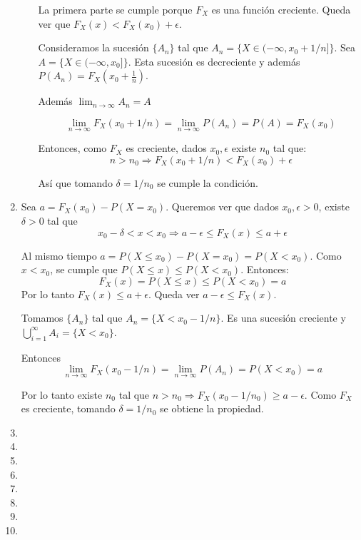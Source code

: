 \begin{enumerate}
\begin{enumerate}
					La primera parte se cumple porque $F_X$ es una función creciente. Queda ver que $F_X(x) < F_X(x_0) + \epsilon$.
					
					Consideramos la sucesión $\{A_n\}$ tal que $A_n = \{X \in (-\infty, x_0 + 1/n]\}$. Sea $A = \{X \in (-\infty, x_0]\}$.
					Esta sucesión es decreciente y además $P(A_n) = F_X(x_0+\frac{1}{n})$.
					
					Además $\lim_{n\rightarrow \infty}A_n = A$
					
					$$\lim_{n\rightarrow \infty}F_X(x_0 + 1/n) = \lim_{n\rightarrow \infty}P(A_n) = P(A) = F_X(x_0)$$
					
					Entonces, como $F_X$ es creciente, dados $x_0, \epsilon$ existe $n_0$ tal que:
					$$n > n_0 \Rightarrow F_X(x_0 + 1/n) < F_X(x_0) + \epsilon$$
					
					Así que tomando $\delta = 1/n_0$ se cumple la condición.
			\end{enumerate}
	\item
		Sea $a = F_X(x_0) - P(X=x_0)$. Queremos ver que dados $x_0, \epsilon > 0$, existe $\delta > 0$ tal que
		$$x_0 - \delta < x < x_0 \Rightarrow a - \epsilon \leq F_X(x) \leq a + \epsilon$$
		
		Al mismo tiempo $a = P(X\leq x_0) - P(X=x_0) = P(X < x_0)$.
		Como $x < x_0$, se cumple que $P(X\leq x) \leq P(X<x_0)$. Entonces:
		$$F_X(x) = P(X\leq x) \leq P(X<x_0) = a$$
		Por lo tanto $F_X(x) \leq a + \epsilon$. Queda ver $a - \epsilon \leq F_X(x)$.
		
		Tomamos $\{A_n\}$ tal que $A_n=\{X < x_0-1/n\}$. Es una sucesión creciente y $\bigcup_{i=1}^{\infty}A_i = \{X<x_0\}$.
		
		Entonces $$\lim_{n\rightarrow\infty}F_X(x_0 - 1/n) = \lim_{n\rightarrow\infty}P(A_n) = P(X < x_0) = a$$
		
		Por lo tanto existe $n_0$ tal que $n>n_0\Rightarrow F_X(x_0 - 1/n_0) \geq a - \epsilon$.
		Como $F_X$ es creciente, tomando $\delta = 1/n_0$ se obtiene la propiedad. 
	\item
		
	\item
		
	\item
		
	\item
		
	\item
		
	\item
		
	\item
		
	\item
		
\end{enumerate}
